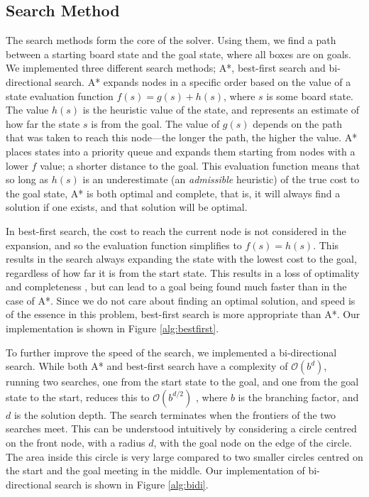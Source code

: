\documentclass[a4paper,11pt]{article}
\begin{document}
\subsection{Search Method}
The search methods form the core of the solver. Using them, we find a path
between a starting board state and the goal state, where all boxes are on
goals. We implemented three different search methods; A*, best-first search and
bi-directional search. A* expands nodes in a specific order based on the value
of a state evaluation function $f(s)=g(s)+h(s)$, where $s$ is some board
state. The value $h(s)$ is the heuristic value of the state, and represents an
estimate of how far the state $s$ is from the goal. The value of $g(s)$ depends
on the path that was taken to reach this node---the longer the path, the higher
the value. A* places states into a priority queue and expands them starting from
nodes with a lower $f$ value; a shorter distance to the goal. This evaluation
function means that so long as $h(s)$ is an underestimate (an \emph{admissible}
heuristic) of the true cost to the goal state, A* is both optimal and complete,
that is, it will always find a solution if one exists, and that solution will be
optimal\cite{aima}.

In best-first search, the cost to reach the current node is not considered in
the expansion, and so the evaluation function simplifies to $f(s)=h(s)$. This
results in the search always expanding the state with the lowest cost to the
goal, regardless of how far it is from the start state. This results in a loss
of optimality and completeness \cite{aima}, but can lead to a goal being found
much faster than in the case of A*. Since we do not care about finding an
optimal solution, and speed is of the essence in this problem, best-first search
is more appropriate than A*. Our implementation is shown in Figure
\ref{alg:bestfirst}.

To further improve the speed of the search, we implemented a bi-directional
search. While both A* and best-first search have a complexity of
$\mathcal{O}(b^d)$, running two searches, one from the start state to the goal,
and one from the goal state to the start, reduces this to $\mathcal{O}(b^{d/2})$
\cite{aima}, where $b$ is the branching factor, and $d$ is the solution
depth. The search terminates when the frontiers of the two searches meet. This
can be understood intuitively by considering a circle centred on the front node,
with a radius $d$, with the goal node on the edge of the circle. The area inside
this circle is very large compared to two smaller circles centred on the start
and the goal meeting in the middle. Our implementation of bi-directional search
is shown in Figure \ref{alg:bidi}.
\end{document}
